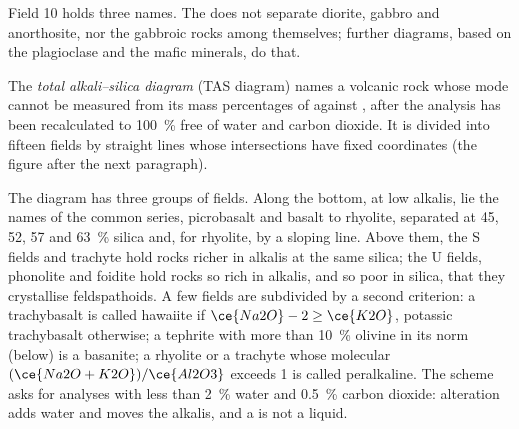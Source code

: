 \begin{omfigure}
\par{}
\end{omfigure}

Field 10 holds three names. The  does not separate diorite, gabbro and
anorthosite, nor the gabbroic rocks among themselves; further diagrams, based on the
plagioclase and the mafic minerals, do that.

\begin{definition}\label{def:b2:magmatic-series:tas}
The \emph{total alkali--silica diagram} (TAS
diagram) names a volcanic rock whose mode cannot be measured from its mass
percentages of  against , after the analysis has been
recalculated to \qty{100}{\percent} free of water and carbon dioxide. It is divided
into fifteen fields by straight lines whose intersections have fixed coordinates
(the figure after the next paragraph).
\end{definition}

The diagram has three groups of fields. Along the bottom, at low alkalis, lie the
names of the common series, picrobasalt and basalt to rhyolite, separated at 45, 52,
57 and \qty{63}{\percent} silica and, for rhyolite, by a sloping line. Above them, the S fields and trachyte hold rocks richer in
alkalis at the same silica; the U fields, phonolite and foidite hold rocks so rich in
alkalis, and so poor in silica, that they crystallise feldspathoids. A few fields are
subdivided by a second criterion: a trachybasalt is called hawaiite if $\ce{Na2O} - 2
\ge \ce{K2O}$, potassic trachybasalt otherwise; a tephrite with more than
\qty{10}{\percent} olivine in its norm (below) is a basanite; a rhyolite or a trachyte whose
molecular $(\ce{Na2O + K2O})/\ce{Al2O3}$ exceeds 1 is called peralkaline. The scheme
asks for analyses with less than \qty{2}{\percent} water and \qty{0.5}{\percent}
carbon dioxide: alteration adds water and moves the alkalis, and a  is not a
liquid.

